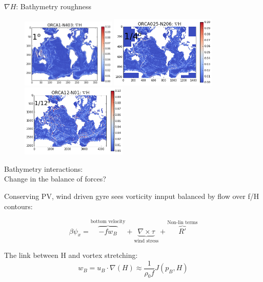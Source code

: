 \documentclass{beamer}
\begin{document}
\begin{frame}{$\nabla H$: Bathymetry roughness}
\begin{center}
\begin{figure}[H]
\centering
  \includegraphics[width=0.4\textwidth]{ORCA1_N403_nablaH_26FebP.png}
  \includegraphics[width=0.45\textwidth]{ORCA025_N206_nablaH_26FebP.png}\\
  \includegraphics[width=0.45\textwidth]{ORCA12_N01_nablaH_26FebP.png}
\end{figure}
\end{center}
\end{frame}

\begin{frame}{Bathymetry interactions:\\Change in the balance of forces?}

Conserving PV, wind driven gyre sees vorticity innput balanced by flow over f/H contours:
\begin{center}
$$\beta \psi_{x}=\overbrace{-f w_{B}}^{\text{bottom velocity}}+\underbrace{\nabla \times \tau}_{\text{wind stress}} + \overbrace{R'}^{\text{Non-lin terms}}$$
\end{center}
The link between H and vortex stretching:
$$w_{B} = u_{B}\cdot \nabla (H) \approx \frac{1}{\rho_{0}f}J(p_{B}, H)$$
\end{frame}
\end{document}
